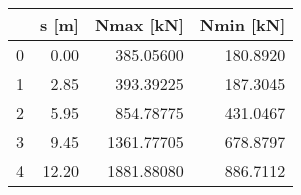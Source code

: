 \begin{tabular}{lrrr}
\toprule
{} &  s [m] &   Nmax [kN] &  Nmin [kN] \\
\midrule
0 &   0.00 &   385.05600 &   180.8920 \\
1 &   2.85 &   393.39225 &   187.3045 \\
2 &   5.95 &   854.78775 &   431.0467 \\
3 &   9.45 &  1361.77705 &   678.8797 \\
4 &  12.20 &  1881.88080 &   886.7112 \\
\bottomrule
\end{tabular}
